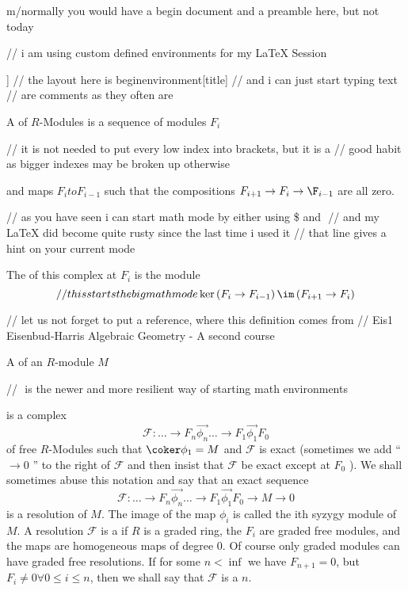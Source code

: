 m/normally you would have a begin document and a preamble here, but not today

// i am using custom defined environments for my LaTeX Session

\begin{defn}[Complex of $R$-modules \nocite[Eis1]{1.10} ]
// the layout here is begin{environment}[title]
// and i can just start typing text
// are comments as they often are

A  of $R$-Modules is a sequence of modules \( F_{i} \)

// it is not needed to put every low index into brackets, but it is a 
// good habit as bigger indexes may be broken up otherwise

and maps \( F_{i} to F_{i-1} \) such that the compositions \( F_{i+1} \to F_{i} \to \F_{i-1} \) are all zero.

// as you have seen i can start math mode by either using  \$ and \(  \) 
// and my LaTeX did become quite rusty since the last time i used it
// that line gives a hint on your current mode

The  of this complex at \( F_{i} \) is the module 
\[
	// this starts the big math mode
	\ker \left( F_{i} \to F_{i-1} \right)   \/ \im \left( F_{i+1} \to F_{i} \right)
\]

// let us not forget to put a reference, where this definition comes from
// Eis1 Eisenbud-Harris Algebraic Geometry - A second course

A  of an \( R\)-module \( M \)

// \( \) is the newer and more resilient way of starting math environments

is a complex
\[
	\mathcal{F}: \hdots \to F_{n} \overset{\to}{\phi_{n}} 
	\hdots \to F_{1} \overset{\to}{\phi_{1}} F_{0}
\]
of free \(R\)-Modules such that \( \coker \phi_{1} = M \) 
and \( \mathcal{F} \)  is exact (sometimes we add `` \( \to 0 \) '' to the right of \(\mathcal{F}\) and then insist that \(\mathcal{F}\) be exact except at \( F_{0} \) ).
We shall sometimes abuse this notation and say that an exact sequence 
\[
	\mathcal{F}: \hdots \to F_{n} \overset{\to}{\phi_{n}} 
	\hdots \to F_{1} \overset{\to}{\phi_{1}} F_{0}
	\to M \to 0
\]
is a resolution of \( M \).  
The image of the map \( \phi_i \) is called the ith syzygy module of \(M \).
A resolution \( \mathcal{F }\) is a  if \( R \) is a graded ring, the \(  F_{i}\) are graded free modules, and the maps are homogeneous maps of degree 0.
Of course only graded modules can have graded free resolutions.
If for some \( n < \inf \) we have \( F_{n+1}=0 \), 
but \( F_{i} \neq 0 \forall 0 \le i \le n \), then we shall say that 
\( \mathcal{F}\) is a  \( n\).
\end{defn}

